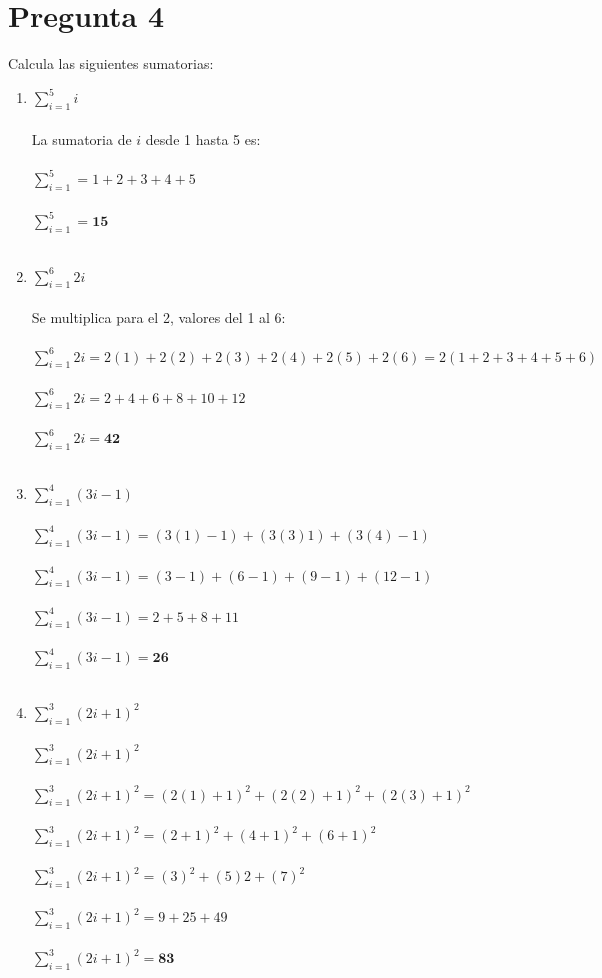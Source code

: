 \documentclass[]{article}
\begin{document}
\section*{Pregunta 4}
Calcula las siguientes sumatorias:

\begin{enumerate}[label=(\alph*)]
	\item $\sum_{i=1}^{5}i$\\\\
	La sumatoria de $i$ desde 1 hasta 5 es:\\\\
	$\sum_{i=1}^{5}=1+2+3+4+5$\\\\
	$\sum_{i=1}^{5}=\textbf{15}$\\\\
	\item $\sum_{i=1}^{6}2i$\\\\
	Se multiplica para el 2, valores del 1 al 6:\\\\
	$\sum_{i=1}^{6}2i=2(1) + 2(2) + 2(3) + 2(4) + 2(5) + 2(6)=2(1 + 2 + 3 + 4 + 5 + 6)$\\\\
	$\sum_{i=1}^{6}2i=2 + 4 + 6 + 8 + 10 + 12$\\\\
	$\sum_{i=1}^{6}2i=\textbf{42}$\\\\
	\item $\sum_{i=1}^{4}(3i-1)$\\\\
	$\sum_{i=1}^{4}(3i-1)=(3(1)-1)+(3(3)1)+(3(4)-1)$\\\\
	$\sum_{i=1}^{4}(3i-1)=(3-1)+(6-1)+(9-1)+(12-1)$\\\\
	$\sum_{i=1}^{4}(3i-1)=2+5+8+11$\\\\
	$\sum_{i=1}^{4}(3i-1)=\textbf{26}$\\\\
	\item $\sum_{i=1}^{3}(2i+1)^2$\\\\
	$\sum_{i=1}^{3}(2i+1)^2$\\\\
	$\sum_{i=1}^{3}(2i+1)^2=(2(1)+1)^2 + (2(2)+1)^2 + (2(3)+1)^2$\\\\
	$\sum_{i=1}^{3}(2i+1)^2=(2 + 1)^2 + (4 + 1)^2 + (6 + 1)^2$\\\\
	$\sum_{i=1}^{3}(2i+1)^2=(3)^2+(5)2+(7)^2$\\\\
	$\sum_{i=1}^{3}(2i+1)^2=9+25+49$\\\\
	$\sum_{i=1}^{3}(2i+1)^2=\textbf{83}$
\end{enumerate}
\end{document}
